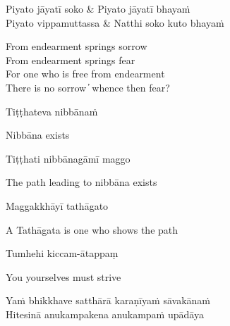 
\begin{twochants}
  Piyato jāyatī soko & Piyato jāyatī bhayaṁ\\
  Piyato vippamuttassa & Natthi soko kuto bhayaṁ\\
\end{twochants}

\begin{english}
  From endearment springs sorrow\\
  From endearment springs fear\\
  For one who is free from endearment\\
  There is no sorrow  ̓  whence then fear?
\end{english}


\begin{twochants}
  Tiṭṭhateva nibbānaṁ
\end{twochants}

\begin{english}
  Nibbāna exists
\end{english}

\begin{twochants}
  Tiṭṭhati nibbānagāmī maggo
\end{twochants}

\begin{english}
  The path leading to nibbāna exists
\end{english}

\begin{twochants}
  Maggakkhāyī tathāgato
\end{twochants}

\begin{english}
  A Tathāgata is one who shows the path
\end{english}


\begin{twochants}
  Tumhehi kiccam-ātappaṃ
\end{twochants}

\begin{english}
  You yourselves must strive
\end{english}


\begin{twochants}
  Yaṁ bhikkhave satthārā karaṇīyaṁ sāvakānaṁ\\
  Hitesinā anukampakena anukampaṁ upādāya\\
\end{twochants}

